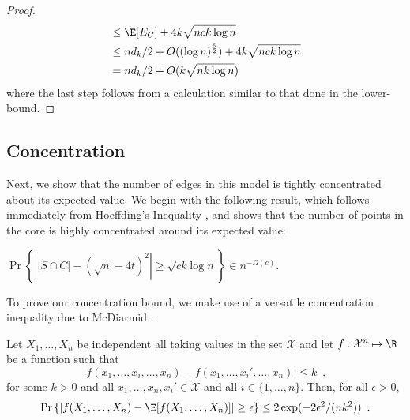 \documentclass{patmorin}
\begin{document}
\begin{proof}
\begin{align*}
           & \le \E[E_C] + 4k\sqrt{nck\log n} \\
           & \le nd_k/2 + O((\log n)^\frac52) + 4k\sqrt{nck\log n} \\
           & = nd_k/2 + O(k\sqrt{nk\log n})
  \end{align*}
  where the last step follows from a calculation similar to that
  done in the lower-bound.
%
%
%
\end{proof}

\subsection{Concentration}

Next, we show that the number of edges in this model is tightly
concentrated about its expected value.  We begin with the following
result, which follows immediately from Hoeffding's Inequality
\cite{boucheron.lugosi.ea:concentration}, and shows that the number of
points in the core is highly concentrated around its expected value:
\begin{lem}
  $\Pr\left\{\left||S\cap C|-(\sqrt{n}-4t)^2\right| \ge \sqrt{ck\log n}\right\}
  \in n^{-\Omega(c)}$.
\end{lem}

To prove our concentration bound, we make use of a versatile concentration
inequality due to McDiarmid \cite[Lemma~1.2]{mcdiarmid:on}:

\begin{lem}
Let $X_1,\ldots,X_n$ be independent all taking values in the set
$\mathcal{X}$ and let $f:\mathcal{X}^n\mapsto\R$ be a function such that
\[
    |f(x_1,\ldots,x_i,\ldots,x_n) - f(x_1,\ldots,x_i',\ldots,x_n)|
    \le k \enspace ,
\]
for some $k>0$ and all $x_1,\ldots,x_n,x_i'\in \mathcal{X}$
and all $i\in\{1,\ldots,n\}$.
Then, for all $\epsilon > 0$,
\[
    \Pr\left\{\left|f(X_1,\ldots,X_n) - \E[f(X_1,\ldots,X_n)]\right| \ge \epsilon\right\}
       \le 2\exp(-2\epsilon^2/(nk^2)) \enspace .
\]
\end{lem}
\end{document}
